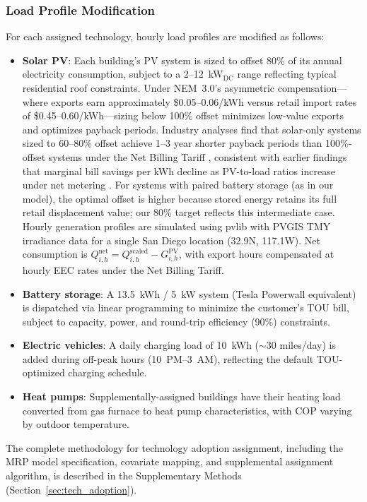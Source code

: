 \documentclass[12pt]{article}
\begin{document}
\subsubsection{Load Profile Modification}

For each assigned technology, hourly load profiles are modified as follows:
\begin{itemize}
    \item \textbf{Solar PV}: Each building's PV system is sized to offset 80\% of its annual electricity consumption, subject to a 2--12~kW$_{\text{DC}}$ range reflecting typical residential roof constraints. Under NEM~3.0's asymmetric compensation---where exports earn approximately \$0.05--0.06/kWh versus retail import rates of \$0.45--0.60/kWh---sizing below 100\% offset minimizes low-value exports and optimizes payback periods. Industry analyses find that solar-only systems sized to 60--80\% offset achieve 1--3 year shorter payback periods than 100\%-offset systems under the Net Billing Tariff \citep{AuroraSolar_NEM3_Sizing}, consistent with earlier findings that marginal bill savings per kWh decline as PV-to-load ratios increase under net metering \citep{Darghouth2011}. For systems with paired battery storage (as in our model), the optimal offset is higher because stored energy retains its full retail displacement value; our 80\% target reflects this intermediate case. Hourly generation profiles are simulated using pvlib \citep{pvlib} with PVGIS TMY irradiance data for a single San Diego location (32.9\textdegree N, 117.1\textdegree W). Net consumption is $Q_{i,h}^{\text{net}} = Q_{i,h}^{\text{scaled}} - G_{i,h}^{\text{PV}}$, with export hours compensated at hourly EEC rates under the Net Billing Tariff.
    \item \textbf{Battery storage}: A 13.5~kWh / 5~kW system (Tesla Powerwall equivalent) is dispatched via linear programming to minimize the customer's TOU bill, subject to capacity, power, and round-trip efficiency (90\%) constraints.
    \item \textbf{Electric vehicles}: A daily charging load of 10~kWh ($\sim$30 miles/day) is added during off-peak hours (10~PM--3~AM), reflecting the default TOU-optimized charging schedule.
    \item \textbf{Heat pumps}: Supplementally-assigned buildings have their heating load converted from gas furnace to heat pump characteristics, with COP varying by outdoor temperature.
\end{itemize}

The complete methodology for technology adoption assignment, including the MRP model specification, covariate mapping, and supplemental assignment algorithm, is described in the Supplementary Methods (Section~\ref{sec:tech_adoption}).
\end{document}
